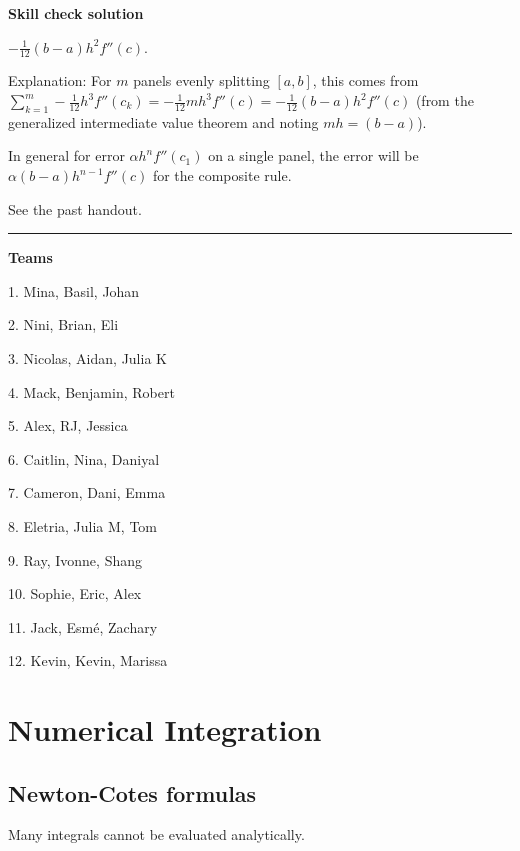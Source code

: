 \documentclass[12pt,letterpaper,noanswers]{exam}
\begin{document}
\noindent \textbf{Skill check solution}
\begin{questions}
\item $-\frac{1}{12}(b-a)h^2f''(c)$.  

Explanation:
For $m$ panels evenly splitting $[a,b]$, this comes from $\sum\limits_{k=1}^m -\frac{1}{12}h^3f''(c_k) = -\frac{1}{12}mh^3f''(c) = -\frac{1}{12}(b-a)h^2f''(c)$ (from the generalized intermediate value theorem and noting $mh = (b-a)$).

In general for error $\alpha h^nf''(c_1)$ on a single panel, the error will be $\alpha (b-a)h^{n-1}f''(c)$ for the composite rule.



\item See the past handout.
\end{questions}
\vspace{0.2cm}
\hrule
\vspace{0.2cm}

\noindent \textbf{Teams}
\begin{multicols}{3}
1. Mina, Basil, Johan

2. Nini, Brian, Eli

3. Nicolas, Aidan, Julia K

4. Mack, Benjamin, Robert

5. Alex, RJ, Jessica

6. Caitlin, Nina, Daniyal

7. Cameron, Dani, Emma

8. Eletria, Julia M, Tom

9. Ray, Ivonne, Shang

10.  Sophie, Eric, Alex

11. Jack, Esmé, Zachary

12. Kevin, Kevin, Marissa

\end{multicols}


\section*{Numerical Integration}
\subsection*{Newton-Cotes formulas}
Many integrals cannot be evaluated analytically.
\end{document}
